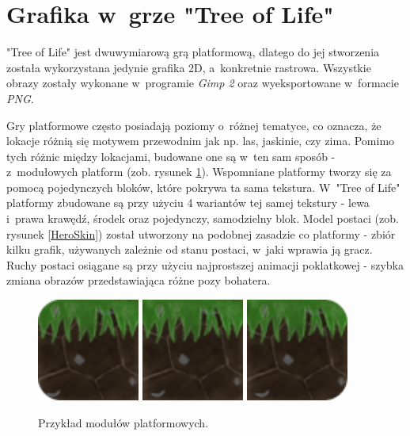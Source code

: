 \documentclass[12pt,a4paper,oneside]{book}
\theoremstyle{definition}
\numberwithin{equation}{chapter}
\begin{document}
\section{Grafika w~grze "Tree of Life"}

\par "Tree of Life" jest dwuwymiarową grą platformową, dlatego do jej stworzenia została wykorzystana jedynie grafika 2D, a~konkretnie rastrowa. Wszystkie obrazy zostały wykonane w~programie \textit{Gimp 2} oraz wyeksportowane w~formacie \textit{PNG}.
\par Gry platformowe często posiadają poziomy o~różnej tematyce, co oznacza, że lokacje różnią się motywem przewodnim jak np. las, jaskinie, czy zima. Pomimo tych różnic między lokacjami, budowane one są w~ten sam sposób - z~modułowych platform (zob. rysunek \ref{PlatformTexture}). Wspomniane platformy tworzy się za pomocą pojedynczych bloków, które pokrywa ta sama tekstura. W~"Tree of Life" platformy zbudowane są przy użyciu 4 wariantów tej samej tekstury - lewa i~prawa krawędź, środek oraz pojedynczy, samodzielny blok. Model postaci (zob. rysunek \ref{HeroSkin}) został utworzony na podobnej zasadzie co platformy - zbiór kilku grafik, używanych zależnie od stanu postaci, w~jaki wprawia ją gracz. Ruchy postaci osiągane są przy użyciu najprostszej animacji poklatkowej - szybka zmiana obrazów przedstawiająca różne pozy bohatera. 


\begin{figure}[hpt!]
        \centering
        \includegraphics[width=0.3\textwidth]{images/grass_L.png}
        \includegraphics[width=0.3\textwidth]{images/grass_C.png}
        \includegraphics[width=0.3\textwidth]{images/grass_R.png}
        \caption{Przykład modułów platformowych.}
        \label{PlatformTexture}
\end{figure}
\end{document}
